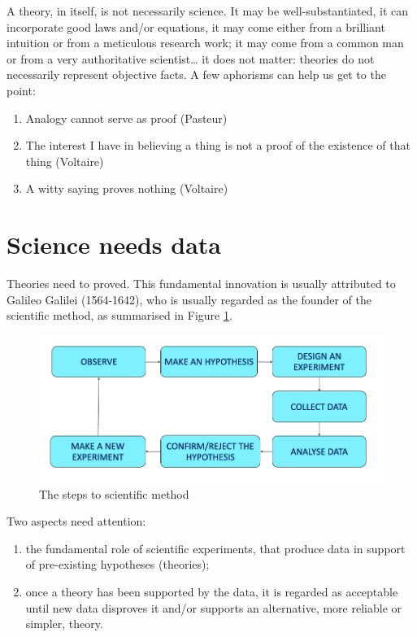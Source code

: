 \documentclass[a4paper,12pt,oneside]{book}
\providecommand{\tightlist}{%
  \setlength{\itemsep}{0pt}\setlength{\parskip}{0pt}}
\begin{document}
A theory, in itself, is not necessarily science. It may be well-substantiated, it can incorporate good laws and/or equations, it may come either from a brilliant intuition or from a meticulous research work; it may come from a common man or from a very authoritative scientist\ldots{} it does not matter: theories do not necessarily represent objective facts. A few aphorisms can help us get to the point:

\begin{enumerate}
\def\labelenumi{\arabic{enumi}.}
\tightlist
\item
  Analogy cannot serve as proof (Pasteur)
\item
  The interest I have in believing a thing is not a proof of the existence of that thing (Voltaire)
\item
  A witty saying proves nothing (Voltaire)
\end{enumerate}

\hypertarget{science-needs-data}{%
\section{Science needs data}\label{science-needs-data}}

Theories need to proved. This fundamental innovation is usually attributed to Galileo Galilei (1564-1642), who is usually regarded as the founder of the scientific method, as summarised in Figure \ref{fig:figName11}.

\begin{figure}

{\centering \includegraphics[width=0.75\linewidth]{_images/MSAMap} 

}

\caption{The steps to scientific method}\label{fig:figName11}
\end{figure}

Two aspects need attention:

\begin{enumerate}
\def\labelenumi{\arabic{enumi}.}
\tightlist
\item
  the fundamental role of scientific experiments, that produce data in support of pre-existing hypotheses (theories);
\item
  once a theory has been supported by the data, it is regarded as acceptable until new data disproves it and/or supports an alternative, more reliable or simpler, theory.
\end{enumerate}
\end{document}
